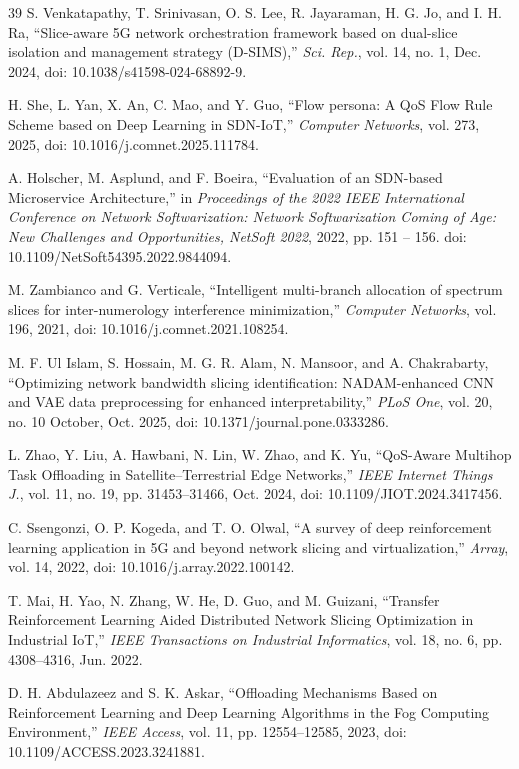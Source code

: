 \documentclass[conference]{IEEEtran}
\begin{document}
\begin{thebibliography}{39}
 S. Venkatapathy, T. Srinivasan, O. S. Lee, R. Jayaraman, H. G. Jo, and I. H. Ra, ``Slice-aware 5G network orchestration framework based on dual-slice isolation and management strategy (D-SIMS),'' \emph{Sci. Rep.}, vol. 14, no. 1, Dec. 2024, doi: 10.1038/s41598-024-68892-9.

 H. She, L. Yan, X. An, C. Mao, and Y. Guo, ``Flow persona: A QoS Flow Rule Scheme based on Deep Learning in SDN-IoT,'' \emph{Computer Networks}, vol. 273, 2025, doi: 10.1016/j.comnet.2025.111784.

 A. Holscher, M. Asplund, and F. Boeira, ``Evaluation of an SDN-based Microservice Architecture,'' in \emph{Proceedings of the 2022 IEEE International Conference on Network Softwarization: Network Softwarization Coming of Age: New Challenges and Opportunities, NetSoft 2022}, 2022, pp. 151 -- 156. doi: 10.1109/NetSoft54395.2022.9844094.

 M. Zambianco and G. Verticale, ``Intelligent multi-branch allocation of spectrum slices for inter-numerology interference minimization,'' \emph{Computer Networks}, vol. 196, 2021, doi: 10.1016/j.comnet.2021.108254.

 M. F. Ul Islam, S. Hossain, M. G. R. Alam, N. Mansoor, and A. Chakrabarty, ``Optimizing network bandwidth slicing identification: NADAM-enhanced CNN and VAE data preprocessing for enhanced interpretability,'' \emph{PLoS One}, vol. 20, no. 10 October, Oct. 2025, doi: 10.1371/journal.pone.0333286.

 L. Zhao, Y. Liu, A. Hawbani, N. Lin, W. Zhao, and K. Yu, ``QoS-Aware Multihop Task Offloading in Satellite--Terrestrial Edge Networks,'' \emph{IEEE Internet Things J.}, vol. 11, no. 19, pp. 31453--31466, Oct. 2024, doi: 10.1109/JIOT.2024.3417456.

 C. Ssengonzi, O. P. Kogeda, and T. O. Olwal, ``A survey of deep reinforcement learning application in 5G and beyond network slicing and virtualization,'' \emph{Array}, vol. 14, 2022, doi: 10.1016/j.array.2022.100142.

 T. Mai, H. Yao, N. Zhang, W. He, D. Guo, and M. Guizani, ``Transfer Reinforcement Learning Aided Distributed Network Slicing Optimization in Industrial IoT,'' \emph{IEEE Transactions on Industrial Informatics}, vol. 18, no. 6, pp. 4308--4316, Jun. 2022.

 D. H. Abdulazeez and S. K. Askar, ``Offloading Mechanisms Based on Reinforcement Learning and Deep Learning Algorithms in the Fog Computing Environment,'' \emph{IEEE Access}, vol. 11, pp. 12554--12585, 2023, doi: 10.1109/ACCESS.2023.3241881.


\end{thebibliography}
\end{document}
